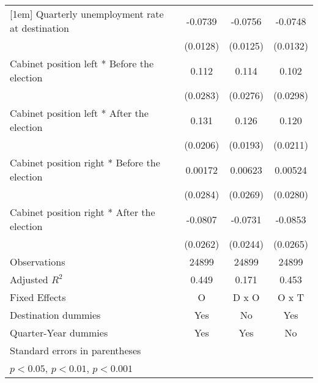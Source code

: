 \begin{table}[htbp]
\begin{tabular}{l*{3}{c}}
[1em]
Quarterly unemployment rate at destination&     -0.0739\sym{***}&     -0.0756\sym{***}&     -0.0748\sym{***}\\
                    &    (0.0128)         &    (0.0125)         &    (0.0132)         \\
[1em]
Cabinet position left * Before the election&       0.112\sym{***}&       0.114\sym{***}&       0.102\sym{**} \\
                    &    (0.0283)         &    (0.0276)         &    (0.0298)         \\
[1em]
Cabinet position left * After the election&       0.131\sym{***}&       0.126\sym{***}&       0.120\sym{***}\\
                    &    (0.0206)         &    (0.0193)         &    (0.0211)         \\
[1em]
Cabinet position right * Before the election&     0.00172         &     0.00623         &     0.00524         \\
                    &    (0.0284)         &    (0.0269)         &    (0.0280)         \\
[1em]
Cabinet position right * After the election&     -0.0807\sym{**} &     -0.0731\sym{**} &     -0.0853\sym{**} \\
                    &    (0.0262)         &    (0.0244)         &    (0.0265)         \\
\hline
Observations        &       24899         &       24899         &       24899         \\
Adjusted \(R^{2}\)  &       0.449         &       0.171         &       0.453         \\
Fixed Effects       &           O         &       D x O         &       O x T         \\
Destination dummies &         Yes         &          No         &         Yes         \\
Quarter-Year dummies&         Yes         &         Yes         &          No         \\
\hline\hline
\multicolumn{4}{l}{\footnotesize Standard errors in parentheses}\\
\multicolumn{4}{l}{\footnotesize \sym{*} \(p<0.05\), \sym{**} \(p<0.01\), \sym{***} \(p<0.001\)}\\
\end{tabular}
\end{table}
